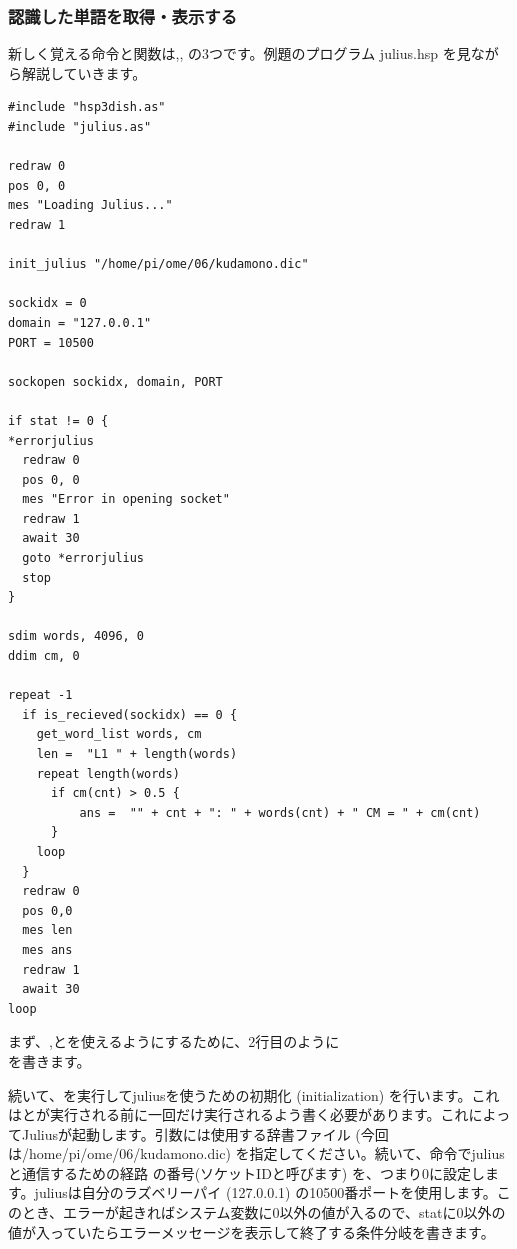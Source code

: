 \subsubsection{認識した単語を取得・表示する}
新しく覚える命令と関数は,,  の3つです。例題のプログラム julius.hsp を見ながら解説していきます。\\
\begin{lstlisting}[caption=julius.hsp,label=julius.hsp]
#include "hsp3dish.as"
#include "julius.as"

redraw 0
pos 0, 0
mes "Loading Julius..."
redraw 1

init_julius "/home/pi/ome/06/kudamono.dic"

sockidx = 0
domain = "127.0.0.1"
PORT = 10500

sockopen sockidx, domain, PORT

if stat != 0 {
*errorjulius
  redraw 0
  pos 0, 0
  mes "Error in opening socket"
  redraw 1
  await 30
  goto *errorjulius
  stop
}

sdim words, 4096, 0
ddim cm, 0

repeat -1
  if is_recieved(sockidx) == 0 {
    get_word_list words, cm
    len =  "L1 " + length(words)
    repeat length(words)
      if cm(cnt) > 0.5 {
          ans =  "" + cnt + ": " + words(cnt) + " CM = " + cm(cnt)
      }
    loop
  }
  redraw 0
  pos 0,0
  mes len
  mes ans
  redraw 1
  await 30
loop
\end{lstlisting}
まず、,とを使えるようにするために、2行目のように\\
を書きます。

続いて、を実行してjuliusを使うための初期化 (initialization) を行います。これはとが実行される前に一回だけ実行されるよう書く必要があります。これによってJuliusが起動します。引数には使用する辞書ファイル (今回は/home/pi/ome/06/kudamono.dic) を指定してください。続いて、命令でjuliusと通信するための経路 の番号(ソケットIDと呼びます) を、つまり0に設定します。juliusは自分のラズベリーパイ (127.0.0.1) の10500番ポートを使用します。このとき、エラーが起きればシステム変数に0以外の値が入るので、statに0以外の値が入っていたらエラーメッセージを表示して終了する条件分岐を書きます。

